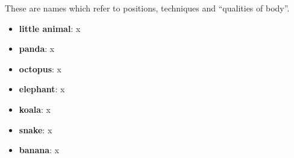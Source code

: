 These are names which refer to positions, techniques and ``qualities of body''.

\begin{itemize}
    \item \textbf{little animal}: x
    \item \textbf{panda}: x
    \item \textbf{octopus}: x
    \item \textbf{elephant}: x
    \item \textbf{koala}: x
    \item \textbf{snake}: x
    \item \textbf{banana}: x
\end{itemize}
